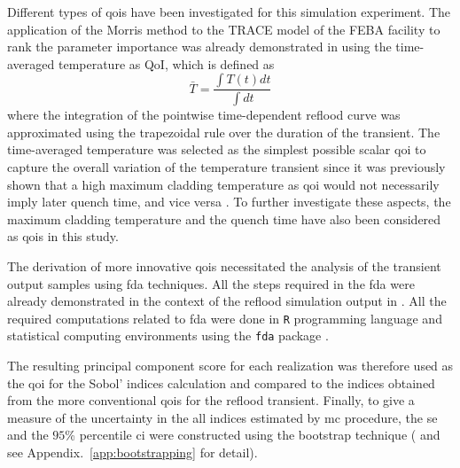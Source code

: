 Different types of \glspl{qoi} have been investigated for this simulation experiment.
The application of the Morris method to the TRACE model of the FEBA facility to rank the parameter importance was already demonstrated in \cite{Wicaksono2014} using the time-averaged temperature as QoI, 
which is defined as
\begin{equation}
	\bar{T} = \frac{\int T(t) dt}{\int dt}
\label{eq:qoi_time_averaged_temperature}
\end{equation}
where the integration of the pointwise time-dependent reflood curve was approximated using the trapezoidal rule over the duration of the transient.
The time-averaged temperature was selected as the simplest possible scalar \gls{qoi} to capture the overall variation of the temperature transient 
since it was previously shown that a high maximum cladding temperature as \gls{qoi} would not necessarily imply later quench time, and vice versa \cite{Wicaksono2014}. 
To further investigate these aspects, the maximum cladding temperature and the quench time have also been considered as \glspl{qoi} in this study.

The derivation of more innovative \glspl{qoi} necessitated the analysis of the transient output samples using \gls{fda} techniques.
All the steps required in the \gls{fda} were already demonstrated in the context of the reflood simulation output in \cite{Wicaksono2014a}.
All the required computations related to \gls{fda} were done in \texttt{R} programming language and statistical computing environments \cite{RCT2017} using the \texttt{fda} package \cite{Ramsay2014}.

The resulting principal component score for each realization was therefore used as the \gls{qoi} for the Sobol' indices calculation and compared to the indices obtained from the more conventional \glspl{qoi} for the reflood transient.
Finally, to give a measure of the uncertainty in the all indices estimated by \gls{mc} procedure, 
the \gls{se} and the $95$\% percentile \gls{ci} were constructed using the bootstrap technique (\cite{Efron1986} and see Appendix.~\ref{app:bootstrapping} for detail).
